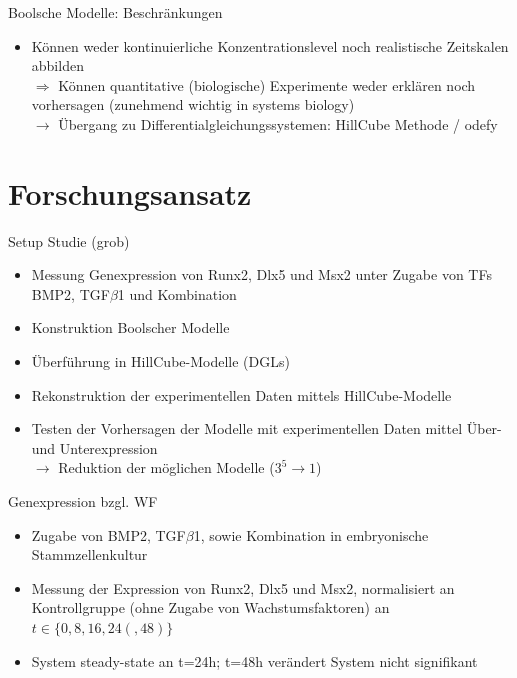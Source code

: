 \documentclass[]{beamer}
\begin{document}
\begin{frame}{Boolsche Modelle: Beschr\"ankungen}
\begin{itemize}
	\item K\"onnen weder kontinuierliche Konzentrationslevel noch realistische Zeitskalen abbilden
	\pause
	\\ $\Rightarrow$ K\"onnen quantitative (biologische) Experimente weder erkl\"aren noch vorhersagen
	\pause (zunehmend wichtig in systems biology)
	\\ \pause $\rightarrow$ \"Ubergang zu Differentialgleichungssystemen: HillCube Methode / odefy
\end{itemize}
\end{frame}

\section{Forschungsansatz}

\begin{frame}{Setup Studie (grob)}
\begin{itemize}
	\item Messung Genexpression von Runx2, Dlx5 und Msx2 unter Zugabe von TFs BMP2, TGF$\beta$1 und Kombination
	\pause
	\item Konstruktion Boolscher Modelle
	\pause
	\item \"Uberf\"uhrung in HillCube-Modelle (DGLs)
	\pause
	\item Rekonstruktion der experimentellen Daten mittels HillCube-Modelle
	\pause
	\item Testen der Vorhersagen der Modelle mit experimentellen Daten mittel \"Uber- und Unterexpression
	\pause
	\\ $\rightarrow$ Reduktion der m\"oglichen Modelle ($3^{5} \rightarrow 1$)
\end{itemize}
\end{frame}

\begin{frame}{Genexpression bzgl. WF}
\begin{itemize}
	\item Zugabe von BMP2, TGF$\beta$1, sowie Kombination in embryonische Stammzellenkultur
	\pause
	\item Messung der Expression von Runx2, Dlx5 und Msx2, normalisiert an Kontrollgruppe (ohne Zugabe von Wachstumsfaktoren) an $t \in \{0,8,16,24(,48)\}$
	\pause
	\item System steady-state an t=24h; t=48h ver\"andert System nicht signifikant
\end{itemize}
\end{frame}
\end{document}

